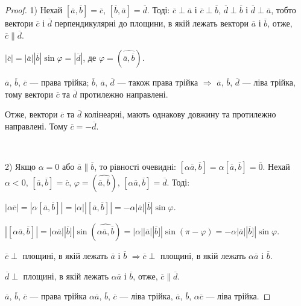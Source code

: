 \begin{proof}
	1) Нехай $[\overline{a}, \overline{b}] = \overline{c}$, $[\overline{b}, \overline{a}] = \overline{d}$.
	Тоді: $\overline{c} \perp \overline{a}$ і $\overline{c} \perp \overline{b}$,
	$\overline{d} \perp \overline{b}$ і $\overline{d} \perp \overline{a}$, тобто вектори $\overline{c}$
	і $\overline{d}$ перпендикулярні до площини, в якій лежать вектори $\overline{a}$ і $\overline{b}$,
	отже, $\overline{c} \parallel \overline{d}$.
	
	$|\overline{c}| = |\overline{a}||\overline{b}|\sin\varphi = |\overline{d}|$, де
	$\varphi = (\widehat{\overline{a},\overline{b}})$.
	
	$\overline{a}$, $\overline{b}$, $\overline{c}$ --- права трійка; $\overline{b}$, $\overline{a}$,
	$\overline{d}$ --- також права трійка $\Rightarrow$ $\overline{a}$, $\overline{b}$, $\overline{d}$
	--- ліва трійка, тому вектори $\overline{c}$ та $\overline{d}$ протилежно направлені.
	
	Отже, вектори $\overline{c}$ та $\overline{d}$ колінеарні, мають однакову довжину та протилежно
	направлені. Тому $\overline{c} = -\overline{d}$.

	~	
	
	2) Якщо $\alpha = 0$ або $\overline{a} \parallel \overline{b}$, то рівності очевидні: 
	$[\alpha \overline{a}, \overline{b}] = \alpha [\overline{a}, \overline{b}] = \overline{0}$.
	Нехай $\alpha < 0$, $[\overline{a}, \overline{b}] = \overline{c}$,
	$\varphi = (\widehat{\overline{a}, \overline{b}})$, $[\alpha \overline{a}, \overline{b}] = \overline{d}$.
	Тоді:
	
	$|\alpha \overline{c}| = |\alpha [\overline{a}, \overline{b}]| = |\alpha| |[\overline{a}, \overline{b}]|
	= -\alpha |\overline{a}| |\overline{b}| \sin\varphi$.
	
	$|[\alpha \overline{a}, \overline{b}]|
	= |\alpha \overline{a}| |\overline{b}]|\sin(\widehat{\alpha \overline{a},\overline{b}})
	= |\alpha| |\overline{a}| |\overline{b}]|\sin(\pi - \varphi)
	= -\alpha |\overline{a}| |\overline{b}]| \sin\varphi$.
	
	$\overline{c}\perp$ площині, в якій лежать $\overline{a}$ і $\overline{b}$
	$\Rightarrow \overline{c} \perp$ площині, в якій лежать $\alpha \overline{a}$ і $\overline{b}$.
	
	$\overline{d}\perp$ площині, в якій лежать $\alpha \overline{a}$ і $\overline{b}$, отже,
	$\overline{c} \parallel \overline{d}$.
	
	$\overline{a}$, $\overline{b}$, $\overline{c}$ --- права трійка $\alpha \overline{a}$,
	$\overline{b}$, $\overline{c}$ --- ліва трійка, $\overline{a}$, $\overline{b}$,
	$\alpha \overline{c}$ --- ліва трійка.
	

\end{proof}
